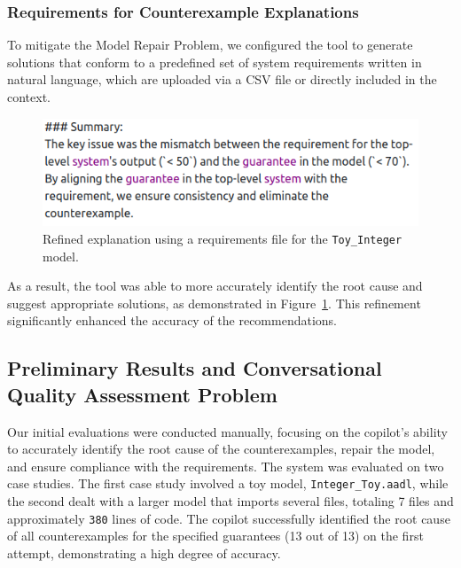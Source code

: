 \subsubsection{Requirements for Counterexample Explanations}

To mitigate the Model Repair Problem, we configured the tool to generate solutions that conform to a predefined set of system requirements written in natural language, which are uploaded via a CSV file or directly included in the context. 

\begin{figure}[t]  
    \centering
    \includegraphics[width=0.95\columnwidth]{REQ-AWARE-REF-high-res.png}  
    \caption{Refined explanation using a requirements file for the \texttt{Toy\_Integer} model.}
    \label{fig:REQ-AWARE-EXPL}
\end{figure}


As a result, the tool was able to more accurately identify the root cause and suggest appropriate solutions, as demonstrated in Figure~\ref{fig:REQ-AWARE-EXPL}.
%
%
This refinement significantly enhanced the accuracy of the recommendations.


\subsection{Preliminary Results and Conversational Quality Assessment Problem}
 
Our initial evaluations were conducted manually, focusing on the copilot's ability to accurately identify the root cause of the counterexamples, repair the model, and ensure compliance with the requirements. The system was evaluated on two case studies. The first case study involved a toy model, \texttt{Integer\_Toy.aadl}, while the second dealt with a larger model that imports several files, totaling 7 files and approximately \texttt{380} lines of code. The copilot successfully identified the root cause of all counterexamples for the specified guarantees (13 out of 13) on the first attempt, demonstrating a high degree of accuracy.

